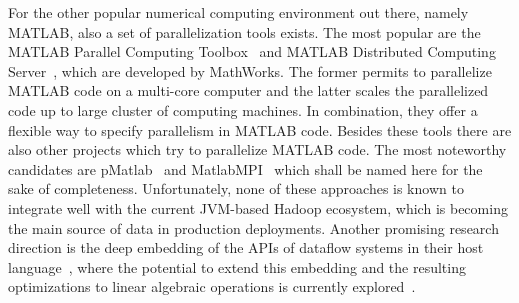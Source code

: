 For the other popular numerical computing environment out there, namely MATLAB, also a set of parallelization tools exists. 
The most popular are the MATLAB Parallel Computing Toolbox~\cite{parallelComputingToolbox} and MATLAB Distributed Computing Server~\cite{distributedComputingServer}, which are developed by MathWorks. 
The former permits to parallelize MATLAB code on a multi-core computer and the latter scales the parallelized code up to large cluster of computing machines. 
In combination, they offer a flexible way to specify parallelism in MATLAB code. 
Besides these tools there are also other projects which try to parallelize MATLAB code. 
The most noteworthy candidates are pMatlab~\cite{bliss:ijhpca2007a} and MatlabMPI~\cite{kepner:jpdc2004a} which shall be named here for the sake of completeness. 
Unfortunately, none of these approaches is known to integrate well with the current JVM-based Hadoop ecosystem, which is becoming the main source of data in production deployments. 
Another promising research direction is the deep embedding of the APIs of dataflow systems in their host language~\cite{Alexandrov2015}, where the potential to extend this embedding and the resulting optimizations to linear algebraic operations is currently explored~\cite{Kunft2016}.